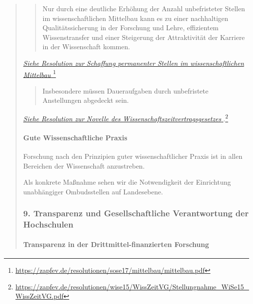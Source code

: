 \documentclass[DIV=14]{scrartcl}
\begin{document}
\begin{quote}
\begin{quote}
Nur durch eine deutliche Erhöhung der Anzahl unbefristeter Stellen im wissenschaftlichen Mittelbau kann es zu einer nachhaltigen Qualitätssicherung in der Forschung und Lehre, effizientem Wissenstransfer und einer Steigerung der Attraktivität der Karriere in der Wissenschaft kommen.
\end{quote}

\href{https://zapfev.de/resolutionen/sose17/mittelbau/mittelbau.pdf}{\emph{Siehe Resolution zur Schaffung permanenter
    Stellen im wissenschaftlichen Mittelbau%
  }}\footnote{\url{https://zapfev.de/resolutionen/sose17/mittelbau/mittelbau.pdf}}

\begin{quote}
Insbesondere müssen Daueraufgaben durch unbefristete Anstellungen abgedeckt sein.
\end{quote}

\href{https://zapfev.de/resolutionen/wise15/WissZeitVG/Stellungnahme_WiSe15_WissZeitVG.pdf}{\emph{Siehe Resolution zur Novelle des Wissenschaftszeitvertragsgesetzes%
  }}.\footnote{\url{https://zapfev.de/resolutionen/wise15/WissZeitVG/Stellungnahme_WiSe15_WissZeitVG.pdf}}

\hypertarget{gute-wissenschaftliche-praxis}{%
\paragraph{Gute Wissenschaftliche Praxis}\label{gute-wissenschaftliche-praxis}}
Forschung nach den Prinzipien guter wissenschaftlicher Praxis ist in allen Bereichen der Wissenschaft anzustreben.

Als konkrete Maßnahme sehen wir die Notwendigkeit der Einrichtung unabhängiger Ombudsstellen auf Landesebene.


\hypertarget{transparenz-und-gesellschaftliche-verantwortung-der-hochschulen}{%
\subsubsection*{9. Transparenz und Gesellschaftliche Verantwortung der Hochschulen}\label{transparenz-und-gesellschaftliche-verantwortung-der-hochschulen}}

\hypertarget{transparenz-in-der-drittmittel-finanzierten-forschung}{%
\paragraph{Transparenz in der Drittmittel-finanzierten Forschung}\label{transparenz-in-der-drittmittel-finanzierten-forschung}}


\end{quote}
\end{document}
